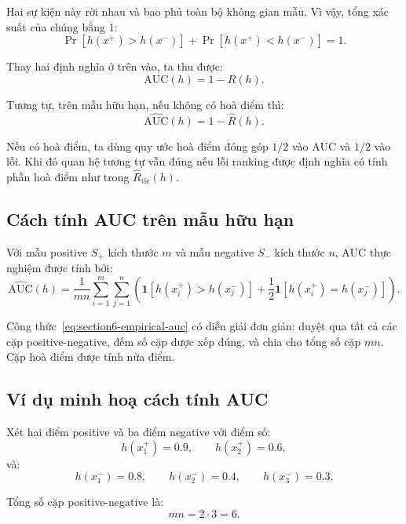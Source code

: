 Hai sự kiện này rời nhau và bao phủ toàn bộ không gian mẫu. Vì vậy, tổng xác suất của chúng bằng \(1\):
\[
    \Pr
    \left[
        h(x^{+}) > h(x^{-})
    \right]
    +
    \Pr
    \left[
        h(x^{+}) < h(x^{-})
    \right]
    =
    1.
\]

Thay hai định nghĩa ở trên vào, ta thu được:
\begin{equation}
    \mathrm{AUC}(h)
    =
    1-R(h).
    \label{eq:section6-auc-one-minus-error}
\end{equation}

Tương tự, trên mẫu hữu hạn, nếu không có hoà điểm thì:
\[
    \widehat{\mathrm{AUC}}(h)
    =
    1-\widehat{R}(h).
\]

Nếu có hoà điểm, ta dùng quy ước hoà điểm đóng góp \(1/2\) vào AUC và \(1/2\) vào lỗi. Khi đó quan hệ tương tự vẫn đúng nếu lỗi ranking được định nghĩa có tính phần hoà điểm như trong \(\widehat{R}_{\mathrm{tie}}(h)\).

\subsection{Cách tính AUC trên mẫu hữu hạn}

Với mẫu positive \(S_{+}\) kích thước \(m\) và mẫu negative \(S_{-}\) kích thước \(n\), AUC thực nghiệm được tính bởi:
\begin{equation}
    \widehat{\mathrm{AUC}}(h)
    =
    \frac{1}{mn}
    \sum_{i=1}^{m}
    \sum_{j=1}^{n}
    \left(
        \mathbf{1}
        \left[
            h(x_i^{+}) > h(x_j^{-})
        \right]
        +
        \frac{1}{2}
        \mathbf{1}
        \left[
            h(x_i^{+}) = h(x_j^{-})
        \right]
    \right).
    \label{eq:section6-empirical-auc}
\end{equation}

Công thức~\eqref{eq:section6-empirical-auc} có diễn giải đơn giản: duyệt qua tất cả các cặp positive-negative, đếm số cặp được xếp đúng, và chia cho tổng số cặp \(mn\). Cặp hoà điểm được tính nửa điểm.

\subsection{Ví dụ minh hoạ cách tính AUC}

Xét hai điểm positive và ba điểm negative với điểm số:
\[
    h(x_1^{+})=0.9,
    \qquad
    h(x_2^{+})=0.6,
\]
và:
\[
    h(x_1^{-})=0.8,
    \qquad
    h(x_2^{-})=0.4,
    \qquad
    h(x_3^{-})=0.3.
\]

Tổng số cặp positive-negative là:
\[
    mn=2\cdot 3=6.
\]

